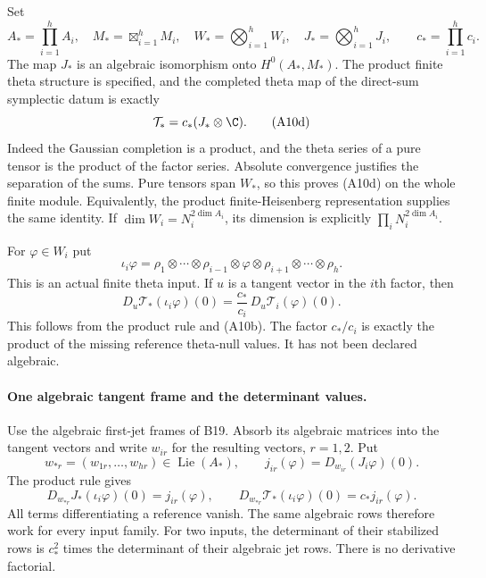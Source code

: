 \documentclass[11pt]{article}
\theoremstyle{definition}\newtheorem{definition}[theorem]{Definition}\newtheorem{remark}[theorem]{Remark}
\begin{document}
Set
\[
 A_* =\prod_{i=1}^h A_i,\quad
 M_* =\boxtimes_{i=1}^h M_i,\quad
 W_* =\bigotimes_{i=1}^h W_i,\quad
 J_* =\bigotimes_{i=1}^hJ_i,
 \qquad c_* =\prod_{i=1}^h c_i.
 \tag{A10c}
\]
The map $J_*$ is an algebraic isomorphism onto
$H^0(A_*,M_*)$.  The product finite theta structure is
specified, and the completed theta map of the direct-sum
symplectic datum is exactly
\[
                    \mathcal T_*=c_*(J_*\otimes\C).
 \tag{A10d}
\]
Indeed the Gaussian completion is a product, and the theta
series of a pure tensor is the product of the factor series.
Absolute convergence justifies the separation of the sums.
Pure tensors span $W_*$, so this proves (A10d) on the whole
finite module.  Equivalently, the product finite-Heisenberg
representation supplies the same identity.  If
$\dim W_i=N_i^{2\dim A_i}$, its dimension is explicitly
$\prod_iN_i^{2\dim A_i}$.

For $\varphi\in W_i$ put
\[
 \iota_i\varphi=
       \rho_1\otimes\cdots\otimes\rho_{i-1}
            \otimes\varphi\otimes
           \rho_{i+1}\otimes\cdots\otimes\rho_h.
 \tag{A10e}
\]
This is an actual finite theta input.  If $u$ is a tangent
vector in the $i$th factor, then
\[
 D_u\mathcal T_*(\iota_i\varphi)(0)
       =\frac{c_*}{c_i}\,D_u\mathcal T_i(\varphi)(0).
 \tag{A10f}
\]
This follows from the product rule and (A10b).  The factor
$c_*/c_i$ is exactly the product of the missing reference
theta-null values.  It has not been declared algebraic.

\paragraph{One algebraic tangent frame and the determinant values.}
Use the algebraic first-jet frames of B19.  Absorb its
algebraic matrices into the tangent vectors and write
$w_{ir}$ for the resulting vectors, $r=1,2$.  Put
\[
 w_{*r}=(w_{1r},\ldots,w_{hr})\in\operatorname{Lie}(A_*),
 \qquad
 j_{ir}(\varphi)=D_{w_{ir}}(J_i\varphi)(0).
 \tag{A10g}
\]
The product rule gives
\[
 D_{w_{*r}}J_*(\iota_i\varphi)(0)=j_{ir}(\varphi),
 \qquad
 D_{w_{*r}}\mathcal T_*(\iota_i\varphi)(0)
                                     =c_*j_{ir}(\varphi).
 \tag{A10h}
\]
All terms differentiating a reference vanish.  The same
algebraic rows therefore work for every input family.
For two inputs, the determinant of their stabilized rows is
$c_*^2$ times the determinant of their algebraic jet rows.
There is no derivative factorial.
\end{document}
